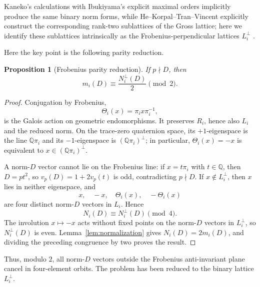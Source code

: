 \documentclass[11pt]{amsart}
\newtheorem{proposition}[theorem]{Proposition}
\theoremstyle{definition}
\theoremstyle{remark}
\newcommand{\Q}{\mathbb{Q}}
\begin{document}
Kaneko's calculations with Ibukiyama's explicit maximal orders implicitly
produce the same binary norm forms, while He--Korpal--Tran--Vincent
explicitly construct the corresponding rank-two sublattices of the Gross
lattice; here we identify these sublattices intrinsically as the
Frobenius-perpendicular lattices $L_i^\perp$
\cite{Kaneko1989,Ibukiyama1982,HeKorpalTranVincent}.

Here the key point is the following parity reduction.

\begin{proposition}[Frobenius parity reduction]\label{prop:four-orbit}
If $p\nmid D$, then
\[
  m_i(D)\equiv \frac{N_i^\perp(D)}2\pmod2.
\]
\end{proposition}

\begin{proof}
Conjugation by Frobenius,
\[
  \Theta_i(x)=\pi_i x\pi_i^{-1},
\]
is the Galois action on geometric endomorphisms.  It preserves $R_i$, hence also $L_i$ and the reduced norm.  On the trace-zero quaternion space, its $+1$-eigenspace is the line $\Q\pi_i$ and its $-1$-eigenspace is $(\Q\pi_i)^\perp$; in particular, $\Theta_i(x)=-x$ is equivalent to $x\in(\Q\pi_i)^\perp$.

A norm-$D$ vector cannot lie on the Frobenius line: if $x=t\pi_i$ with $t\in\Q$, then $D=pt^2$, so
$v_p(D)=1+2v_p(t)$ is odd, contradicting $p\nmid D$.  If $x\notin L_i^\perp$, then $x$ lies in neither eigenspace, and
\[
  x,\quad -x,\quad \Theta_i(x),\quad -\Theta_i(x)
\]
are four distinct norm-$D$ vectors in $L_i$.  Hence
\[
  N_i(D)\equiv N_i^\perp(D)\pmod4.
\]
The involution $x\mapsto-x$ acts without fixed points on the norm-$D$ vectors in $L_i^\perp$, so $N_i^\perp(D)$ is even.  Lemma~\ref{lem:normalization} gives $N_i(D)=2m_i(D)$, and dividing the preceding congruence by two proves the result.
\end{proof}

Thus, modulo $2$, all norm-$D$ vectors outside the Frobenius anti-invariant plane cancel in four-element orbits.  The problem has been reduced to the binary lattice $L_i^\perp$.
\end{document}
